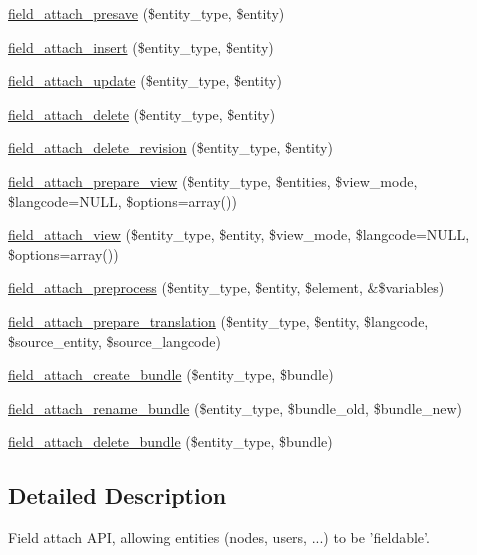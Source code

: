 \begin{DoxyCompactItemize}
\item 
\hyperlink{group__field__attach_ga8f3ecf532dc49f8aed138695489fc81d}{field\_\-attach\_\-presave} (\$entity\_\-type, \$entity)
\item 
\hyperlink{group__field__attach_gad7c37d577b97db5e0c182bc570ed7cf4}{field\_\-attach\_\-insert} (\$entity\_\-type, \$entity)
\item 
\hyperlink{group__field__attach_ga8d15efdca36306ea04552bed4986e77b}{field\_\-attach\_\-update} (\$entity\_\-type, \$entity)
\item 
\hyperlink{group__field__attach_gac2e3658c9c02d0d0e71359f9ef2f207a}{field\_\-attach\_\-delete} (\$entity\_\-type, \$entity)
\item 
\hyperlink{group__field__attach_gaa9eae65e6d9f1996cb27a55ba25b56e9}{field\_\-attach\_\-delete\_\-revision} (\$entity\_\-type, \$entity)
\item 
\hyperlink{group__field__attach_ga12b5fce5e2b2adb487c485c63bfe0298}{field\_\-attach\_\-prepare\_\-view} (\$entity\_\-type, \$entities, \$view\_\-mode, \$langcode=NULL, \$options=array())
\item 
\hyperlink{group__field__attach_gaa752a8fd31173fd2308d71eb059e00c7}{field\_\-attach\_\-view} (\$entity\_\-type, \$entity, \$view\_\-mode, \$langcode=NULL, \$options=array())
\item 
\hyperlink{group__field__attach_ga46c512cf3ddf3937a78f9c7a0da4dce6}{field\_\-attach\_\-preprocess} (\$entity\_\-type, \$entity, \$element, \&\$variables)
\item 
\hyperlink{group__field__attach_ga7ce84fbf2feb3e4b22bacbe6ed5ed103}{field\_\-attach\_\-prepare\_\-translation} (\$entity\_\-type, \$entity, \$langcode, \$source\_\-entity, \$source\_\-langcode)
\item 
\hyperlink{group__field__attach_gab3649772ef7a6416b013a4a556ce51bf}{field\_\-attach\_\-create\_\-bundle} (\$entity\_\-type, \$bundle)
\item 
\hyperlink{group__field__attach_ga25bffa83f84504c834d27b2126f58f51}{field\_\-attach\_\-rename\_\-bundle} (\$entity\_\-type, \$bundle\_\-old, \$bundle\_\-new)
\item 
\hyperlink{group__field__attach_ga97e62a6e4ef80e5513c9ec085d718c7b}{field\_\-attach\_\-delete\_\-bundle} (\$entity\_\-type, \$bundle)
\end{DoxyCompactItemize}


\subsection{Detailed Description}
Field attach API, allowing entities (nodes, users, ...) to be 'fieldable'. 